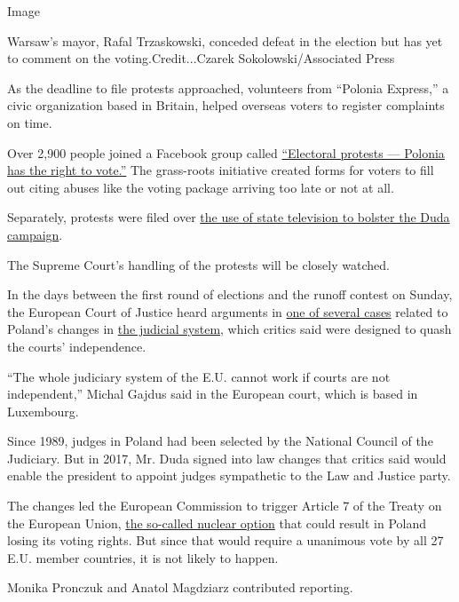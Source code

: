 Image

Warsaw's mayor, Rafal Trzaskowski, conceded defeat in the election but
has yet to comment on the voting.Credit...Czarek Sokolowski/Associated
Press

As the deadline to file protests approached, volunteers from ``Polonia
Express,'' a civic organization based in Britain, helped overseas voters
to register complaints on time.

Over 2,900 people joined a Facebook group called
\href{https://www.facebook.com/groups/271942133870461/}{``Electoral
protests --- Polonia has the right to vote.''} The grass-roots
initiative created forms for voters to fill out citing abuses like the
voting package arriving too late or not at all.

Separately, protests were filed over
\href{https://www.nytimes.com/2019/10/11/world/europe/poland-election-state-television-tvp.html}{the
use of state television to bolster the Duda campaign}.

The Supreme Court's handling of the protests will be closely watched.

In the days between the first round of elections and the runoff contest
on Sunday, the European Court of Justice heard arguments in
\href{https://www.nytimes.com/2018/07/03/world/europe/poland-supreme-court-protest.html}{one
of several cases} related to Poland's changes in
\href{https://www.nytimes.com/2016/04/14/world/europe/poland-eu-parliament.html?action=click\&module=RelatedCoverage\&pgtype=Article\&region=Footer}{the
judicial system}, which critics said were designed to quash the courts'
independence.

``The whole judiciary system of the E.U. cannot work if courts are not
independent,'' Michal Gajdus said in the European court, which is based
in Luxembourg.

Since 1989, judges in Poland had been selected by the National Council
of the Judiciary. But in 2017, Mr. Duda signed into law changes that
critics said would enable the president to appoint judges sympathetic to
the Law and Justice party.

The changes led the European Commission to trigger Article 7 of the
Treaty on the European Union,
\href{https://www.nytimes.com/2017/12/20/world/europe/eu-poland-law.html}{the
so-called nuclear option} that could result in Poland losing its voting
rights. But since that would require a unanimous vote by all 27 E.U.
member countries, it is not likely to happen.

Monika Pronczuk and Anatol Magdziarz contributed reporting.

